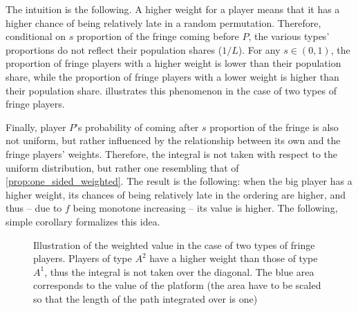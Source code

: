 \documentclass[a4paper]{article}
\begin{document}
The intuition is the following.
A higher weight for a player means that it has a higher chance of being relatively late in a random permutation.
Therefore, conditional on $s$ proportion of the fringe coming before $P$, the various types' proportions do not reflect their population shares ($1/L$).
For any $s \in (0, 1)$, the proportion of fringe players with a higher weight is lower than their population share, while the proportion of fringe players with a lower weight is higher than their population share.
 illustrates this phenomenon in the case of two types of fringe players.

Finally, player $P$'s probability of coming after $s$ proportion of the fringe is also not uniform, but rather influenced by the relationship between its own and the fringe players' weights.
Therefore, the integral is not taken with respect to the uniform distribution, but rather one resembling that of \cref{prop:one_sided_weighted}.
The result is the following: when the big player has a higher weight, its chances of being relatively late in the ordering are higher, and thus -- due to $f$ being monotone increasing -- its value is higher.
The following, simple corollary formalizes this idea.

\begin{figure}
    \centering
    \caption{Illustration of the weighted value in the case of two types of fringe players. Players of type $A^2$ have a higher weight than those of type $A^1$, thus the integral is not taken over the diagonal. The blue area corresponds to the value of the platform (the area have to be scaled so that the length of the path integrated over is one)}
    \label{fig:many_sided_weighted}
\end{figure}
\end{document}
